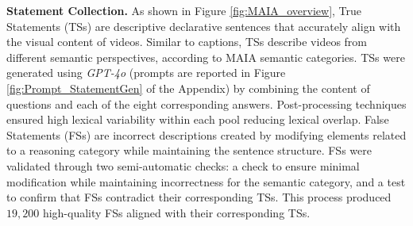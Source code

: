 \textbf{Statement Collection.} 
As shown in Figure \ref{fig:MAIA_overview}, True Statements (TSs) are descriptive declarative sentences that accurately align with the visual content of videos. Similar to captions, TSs describe videos  from different semantic perspectives, according to MAIA semantic categories. %
TSs were generated using \textit{GPT-4o} (prompts are reported in Figure \ref{fig:Prompt_StatementGen} of the Appendix) by combining the content of questions and each of the eight corresponding answers. Post-processing techniques ensured high lexical variability within each pool reducing lexical overlap. False Statements (FSs) are incorrect descriptions created by modifying elements related to a  reasoning category while maintaining the sentence structure. 
FSs were validated through two semi-automatic checks: a  check to ensure minimal modification while maintaining incorrectness for the semantic category, and a test to confirm that FSs contradict their corresponding TSs. This process produced $19,200$ high-quality FSs aligned with their corresponding TSs.

